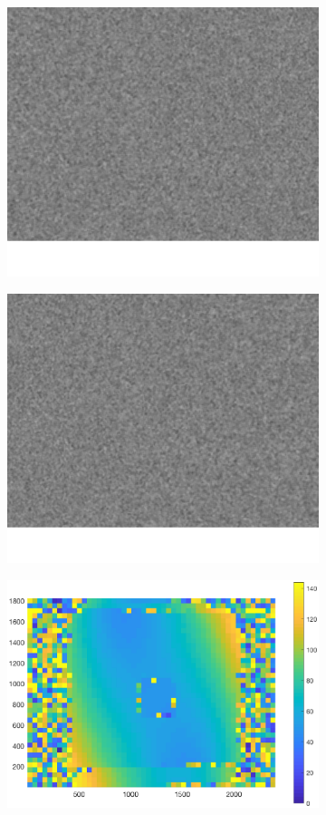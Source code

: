 \begin{figure}[h!]
	\begin{subfigure}[t]{0.3\linewidth}
		\centering
		\includegraphics[width=0.8\linewidth]{figures/part2/test_left_3}
	\end{subfigure}
	\begin{subfigure}[t]{0.3\linewidth}
		\centering
		\includegraphics[width=0.8\linewidth]{figures/part2/test_right_3}
	\end{subfigure}
	\begin{subfigure}[t]{0.35\linewidth}
		\centering
		\includegraphics[width=1\linewidth]{figures/part2/test3_cmp}

\end{subfigure}
\end{figure}
